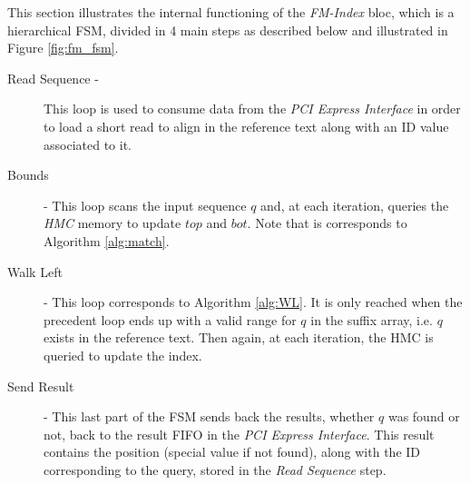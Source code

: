 This section illustrates the internal functioning of the \textsl{FM-Index} bloc, which is a hierarchical FSM, divided in 4 main steps as described below and illustrated in Figure \ref{fig:fm_fsm}.
\begin{description}
\item [Read Sequence -] This loop is used to consume data from the \textsl{PCI Express Interface} in order to load a short read to align in the reference text along with an ID value associated to it.
\item [Bounds] - This loop scans the input sequence $q$ and, at each iteration, queries the \textsl{HMC} memory to update $top$ and $bot$. Note that is corresponds to Algorithm \ref{alg:match}.
\item [Walk Left] - This loop corresponds to Algorithm \ref{alg:WL}. It is only reached when the precedent loop ends up with a valid range for $q$ in the suffix array, i.e. $q$ exists in the reference text. Then again, at each iteration, the HMC is queried to update the index.
\item [Send Result] - This last part of the FSM sends back the results, whether $q$ was found or not, back to the result FIFO in the \textsl{PCI Express Interface}. This result contains the position (special value if not found), along with the ID corresponding to the query, stored in the \textsl{Read Sequence} step.
\end{description}

